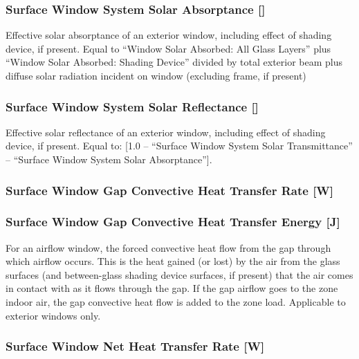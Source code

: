 \subsubsection{Surface Window System Solar Absorptance {[]}}\label{surface-window-system-solar-absorptance}

Effective solar absorptance of an exterior window, including effect of shading device, if present. Equal to ``Window Solar Absorbed: All Glass Layers'' plus ``Window Solar Absorbed: Shading Device'' divided by total exterior beam plus diffuse solar radiation incident on window (excluding frame, if present)

\subsubsection{Surface Window System Solar Reflectance {[]}}\label{surface-window-system-solar-reflectance}

Effective solar reflectance of an exterior window, including effect of shading device, if present. Equal to: {[}1.0 -- ``Surface Window System Solar Transmittance'' -- ``Surface Window System Solar Absorptance''{]}.

\subsubsection{Surface Window Gap Convective Heat Transfer Rate {[}W{]}}\label{surface-window-gap-convective-heat-transfer-rate-w}

\subsubsection{Surface Window Gap Convective Heat Transfer Energy {[}J{]}}\label{surface-window-gap-convective-heat-transfer-energy-j}

For an airflow window, the forced convective heat flow from the gap through which airflow occurs. This is the heat gained (or lost) by the air from the glass surfaces (and between-glass shading device surfaces, if present) that the air comes in contact with as it flows through the gap. If the gap airflow goes to the zone indoor air, the gap convective heat flow is added to the zone load. Applicable to exterior windows only.

\subsubsection{Surface Window Net Heat Transfer Rate {[}W{]}}\label{surface-window-net-heat-transfer-rate-w}

